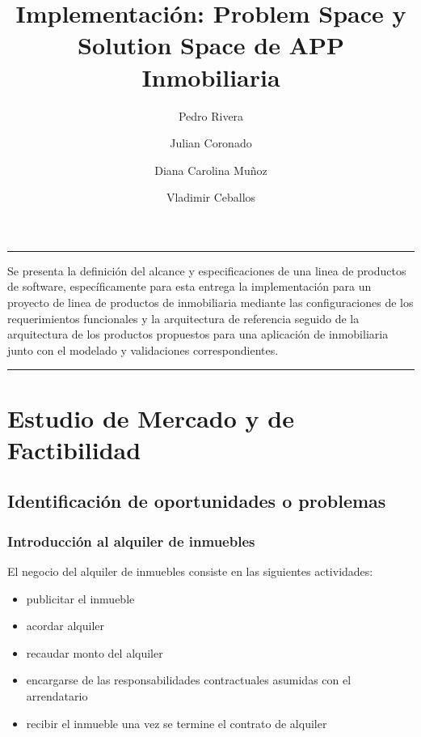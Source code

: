 \documentclass[letterpaper]{article}
\title{\textbf{ Implementación: Problem Space y Solution Space de APP Inmobiliaria }}
\author[1]{Pedro Rivera}
\author[2]{Julian Coronado}
\author[3]{Diana Carolina Muñoz}
\author[4]{Vladimir Ceballos}
\affil[1-3]{ Lineas de Productos de Software,
Pontificia Universidad Javeriana Cali}
\begin{document}
\maketitle
\renewenvironment{abstract}
 {\quotation\small\noindent\rule{\linewidth}{.5pt}\par\smallskip
  {\centering\bfseries\abstractname\par}\medskip}
 {\par\noindent\rule{\linewidth}{.5pt}\endquotation}

\begin{abstract}
Se presenta la definición del alcance y especificaciones de una linea de productos de software, específicamente para esta entrega la implementación para un proyecto de linea de productos de inmobiliaria mediante las configuraciones de los requerimientos funcionales y la arquitectura de referencia seguido de la arquitectura de los productos propuestos para una aplicación de inmobiliaria junto con el modelado y validaciones correspondientes.
\end{abstract}


\section{\textbf{Estudio de Mercado y de Factibilidad}} 

\subsection{Identificación de oportunidades o problemas}

\subsubsection{Introducción al alquiler de inmuebles}

El negocio del alquiler de inmuebles consiste en las siguientes actividades:

\begin{itemize}
    \item publicitar el inmueble
    \item acordar alquiler
    \item recaudar monto del alquiler
    \item encargarse de las responsabilidades contractuales asumidas con el arrendatario
    \item recibir el inmueble una vez se termine el contrato de alquiler
\end{itemize}
\end{document}
